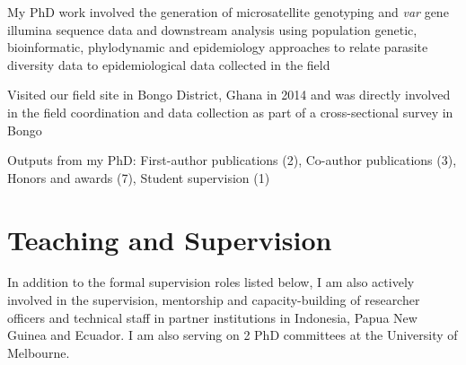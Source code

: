 \documentclass[11pt,a4paper,]{awesome-cv}
\begin{document}
\begin{cventries}
{\begin{cvitems}
\item My PhD work involved the generation of microsatellite genotyping and \textit{var} gene illumina sequence data and downstream analysis using population genetic, bioinformatic, phylodynamic and epidemiology approaches to relate parasite diversity data to epidemiological data collected in the field
\item Visited our field site in Bongo District, Ghana in 2014 and was directly involved in the field coordination and data collection as part of a cross-sectional survey in Bongo
\item Outputs from my PhD: First-author publications (2), Co-author publications (3), Honors and awards (7), Student supervision (1)
\end{cvitems}}
\end{cventries}

\hypertarget{teaching-and-supervision}{%
\section{Teaching and Supervision}\label{teaching-and-supervision}}

\footnotesize

In addition to the formal supervision roles listed below, I am also
actively involved in the supervision, mentorship and capacity-building
of researcher officers and technical staff in partner institutions in
Indonesia, Papua New Guinea and Ecuador. I am also serving on 2 PhD
committees at the University of Melbourne.
\end{document}
